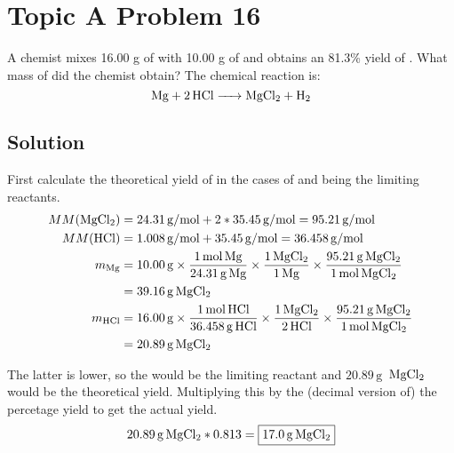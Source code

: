 \documentclass[10pt]{article}
\begin{document}
    \pagebreak
    \section{Topic A Problem 16}
        A chemist mixes 16.00 g of  with 10.00 g of  and obtains an 81.3\% yield of .
        What mass of  did the chemist obtain? 
        The chemical reaction is:
        \begin{equation}
            \ce{Mg + 2 HCl -> MgCl2 + H2}
        \end{equation}

        \subsection{Solution}
            First calculate the theoretical yield of  in the cases of  and  being the limiting reactants.
            \begin{align}
                MM(\ce{MgCl2})  &=  24.31\,\unit{\gram/\mole} + 2 * 35.45\,\unit{\gram/\mole}
                    =   95.21\,\unit{\gram/\mole}\\
                MM(\ce{HCl})    &=  1.008\,\unit{\gram/\mole} + 35.45\,\unit{\gram/\mole}
                    =   36.458\,\unit{\gram/\mole}\\
                m_{\ce{Mg}}     &=  10.00\,\unit{\gram} \times  \frac{1\,\unit{\mole}\,\ce{Mg}}{24.31\,\unit{\gram}\,\ce{Mg}}
                                                        \times  \frac{1\,\ce{MgCl2}}{1\,\ce{Mg}}
                                                        \times  \frac{95.21\,\unit{\gram}\,\ce{MgCl2}}{1\,\unit{\mole}\,\ce{MgCl2}}\\
                                &=  39.16\,\unit{\gram}\,\ce{MgCl2}
                \\
                m_{\ce{HCl}}    &=  16.00\,\unit{\gram} \times  \frac{1\,\unit{\mole}\,\ce{HCl}}{36.458\,\unit{\gram}\,\ce{HCl}}
                                                        \times  \frac{1\,\ce{MgCl2}}{2\,\ce{HCl}}
                                                        \times  \frac{95.21\,\unit{\gram}\,\ce{MgCl2}}{1\,\unit{\mole}\,\ce{MgCl2}}\\
                                &=  20.89\,\unit{\gram}\,\ce{MgCl2}
            \end{align}

            The latter is lower, so the  would be the limiting reactant and $20.89\,\unit{\gram}$ $\,\ce{MgCl2}$ would be the theoretical yield.
            Multiplying this by the (decimal version of) the percetage yield to get the actual yield.
            \begin{gather}
                20.89\,\unit{\gram}\,\ce{MgCl2} * 0.813 = \boxed{17.0\,\unit{\gram}\,\ce{MgCl2}}
            \end{gather}
\end{document}
